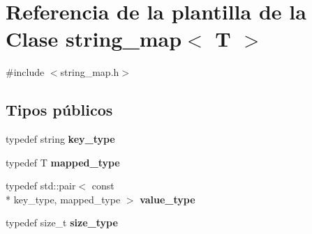 \hypertarget{classstring__map}{\section{Referencia de la plantilla de la Clase string\-\_\-map$<$ T $>$}
\label{classstring__map}
}


{\ttfamily \#include $<$string\-\_\-map.\-h$>$}

\subsection*{Tipos públicos}
\begin{DoxyCompactItemize}
\item 
\hypertarget{classstring__map_ac6b29d74d0658db5938f53b66394d2ca}{typedef string {\bfseries key\-\_\-type}}\label{classstring__map_ac6b29d74d0658db5938f53b66394d2ca}

\item 
\hypertarget{classstring__map_a87309fe41124ea0f9f9fe22729e1fdf7}{typedef T {\bfseries mapped\-\_\-type}}\label{classstring__map_a87309fe41124ea0f9f9fe22729e1fdf7}

\item 
\hypertarget{classstring__map_aba7d0f8b84310cf46a990b404834074b}{typedef std\-::pair$<$ const \\*
key\-\_\-type, mapped\-\_\-type $>$ {\bfseries value\-\_\-type}}\label{classstring__map_aba7d0f8b84310cf46a990b404834074b}

\item 
\hypertarget{classstring__map_a91a355e52de423b8385b72caf553e3de}{typedef size\-\_\-t {\bfseries size\-\_\-type}}\label{classstring__map_a91a355e52de423b8385b72caf553e3de}

\end{DoxyCompactItemize}
